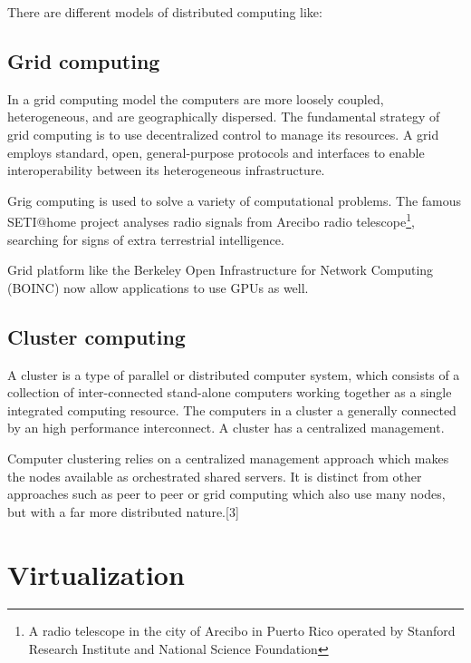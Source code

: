 \documentclass[12pt,a4paper]{report}
\begin{document}
There are different models of distributed computing like:

\subsection{Grid computing}

In a grid computing model the computers are more loosely coupled, heterogeneous, and are geographically dispersed.
The fundamental strategy of grid computing is to use decentralized control to
manage its resources.\cite{foster2002grid} A grid employs standard, open, general-purpose protocols and interfaces to enable interoperability between its heterogeneous infrastructure. 

Grig computing is used to solve a variety of computational problems. The famous SETI@home project 
analyses radio signals from  Arecibo radio telescope\footnote{A radio telescope in the city of 
Arecibo in Puerto Rico operated by Stanford Research Institute and National Science Foundation},
searching for signs of extra terrestrial intelligence.

Grid platform like the Berkeley Open Infrastructure for Network Computing
(BOINC) now allow applications to use GPUs as well.\cite{website:boinc} 

\subsection{Cluster computing}

A cluster is a type of parallel or distributed computer system, which consists of a collection of
inter-connected stand-alone computers working together as a single integrated computing
resource\cite{pfister1998cluster}. The computers in a cluster a generally connected 
by an high performance interconnect. A cluster has a centralized management.

Computer clustering relies on a centralized management approach which makes the nodes available as orchestrated shared servers. It is distinct from other approaches such as peer to peer or grid computing which also use many nodes, but with a far more distributed nature.[3]



\section{Virtualization}

\end{document}
